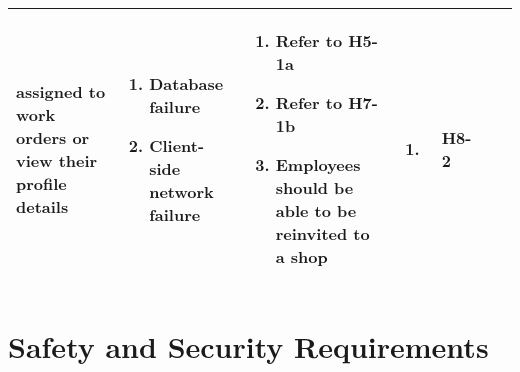 \documentclass{article}
\begin{document}
\begin{landscape}
\begin{longtable}{|p{}|p{}|p{}|p{}|p{}|p{}|p{}|}
		assigned to work orders or view their profile details
		 & \begin{enumerate}[label=\alph*., leftmargin=*]
			   \item Database failure
			   \item Client-side network failure
		   \end{enumerate}
		 & \begin{enumerate}[label=\alph*., leftmargin=*]
			   \item Refer to H5-1a
			   \item Refer to H7-1b
			   \item Employees should be able to be reinvited to a shop
		   \end{enumerate}
		 & \begin{enumerate}[label=\alph*., leftmargin=*]
			   \item
		   \end{enumerate}
		 & H8-2                                                                                                         \\
		\hline
	\end{longtable}
\end{landscape}

\section{Safety and Security Requirements}
\end{document}
